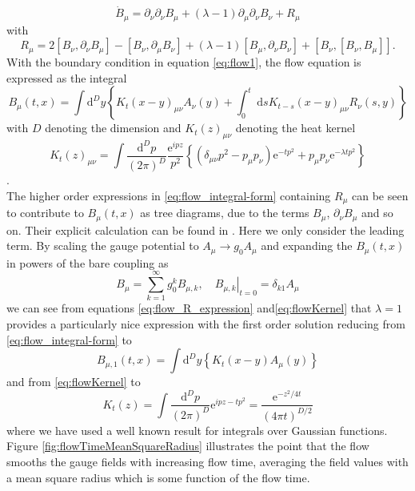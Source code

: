 \documentclass[a4paper,10pt]{book}
\begin{document}
\begin{equation}
\dot{B}_{\mu}=\partial_{\nu} \partial_{\nu} B_{\mu}+\left(\lambda-1\right) \partial_{\mu} \partial_{\nu} B_{\nu}+R_{\mu}
\end{equation}
with 
\begin{equation}\label{eq:flow_R_expression}
R_{\mu}=2\left[B_{\nu}, \partial_{\nu} B_{\mu}\right]-\left[B_{\nu}, \partial_{\mu} B_{\nu}\right]+\left(\lambda-1\right)\left[B_{\mu}, \partial_{\nu} B_{\nu}\right]+\left[B_{\nu},\left[B_{\nu}, B_{\mu}\right]\right].
\end{equation}
With the boundary condition in equation \eqref{eq:flow1}, the flow equation is expressed as the integral
\begin{equation}\label{eq:flow_integral-form}
B_{\mu}(t, x)=\int \mathrm{d}^{D} y\left\{K_{t}(x-y)_{\mu \nu} A_{\nu}(y)+\int_{0}^{t} \mathrm{~d} s K_{t-s}(x-y)_{\mu \nu} R_{\nu}(s, y)\right\}
\end{equation}
with $D$ denoting the dimension and $K_{t}(z)_{\mu \nu}$ denoting the heat kernel
\begin{equation}\label{eq:flowKernel}
K_{t}(z)_{\mu \nu} = \int \frac{\mathrm{d}^{D} p}{(2 \pi)^{D}}\frac{\mathrm{e}^{i p z}}{p^{2}}\left\{\left(\delta_{\mu \nu} p^{2}-p_{\mu} p_{\nu}\right) \mathrm{e}^{-t p^{2}}+p_{\mu} p_{\nu} \mathrm{e}^{-\lambda t p^{2}}\right\}
\end{equation}
\cite{L_scher_2011}.\\The higher order expressions in \eqref{eq:flow_integral-form} containing $R_\mu$ can be seen to contribute to $B_\mu (t,x)$ as tree diagrams, due to the terms $B_\mu$, $\partial_\nu B_\mu$ and so on. Their explicit calculation can be found in \cite{L_scher_2011}. Here we only consider the leading term. By scaling the gauge potential to $A_{\mu} \rightarrow g_{0} A_{\mu}$ and expanding the $B_\mu(t,x)$ in powers of the bare coupling as
\begin{equation}\label{eq:flow_g_0expansion}
B_{\mu}=\sum_{k=1}^{\infty} g_{0}^{k} B_{\mu, k},\left.\quad B_{\mu, k}\right|_{t=0}=\delta_{k 1} A_{\mu}
\end{equation}
we can see from equations \eqref{eq:flow_R_expression} and\eqref{eq:flowKernel} that $\lambda = 1$ provides a particularly nice expression with the first order solution reducing from \eqref{eq:flow_integral-form} to 
\begin{equation}
B_{\mu,1}(t, x)=\int \mathrm{d}^{D} y\left\{K_{t}(x-y) A_{\mu}(y)\right\}
\end{equation}
and from \eqref{eq:flowKernel} to 
\begin{equation}
K_{t}(z) = \int \frac{\mathrm{d}^{D} p}{(2 \pi)^{D}}\mathrm{e}^{i p z-t p^{2}} = \frac{\mathrm{e}^{-z^{2} / 4 t}}{(4 \pi t)^{D / 2}}
\end{equation}
where we have used a well known result for integrals over Gaussian functions.\\Figure \ref{fig:flowTimeMeanSquareRadius} illustrates the point that the flow smooths the gauge fields with increasing flow time, averaging the field values with a mean square radius which is some function of the flow time.  
\end{document}
